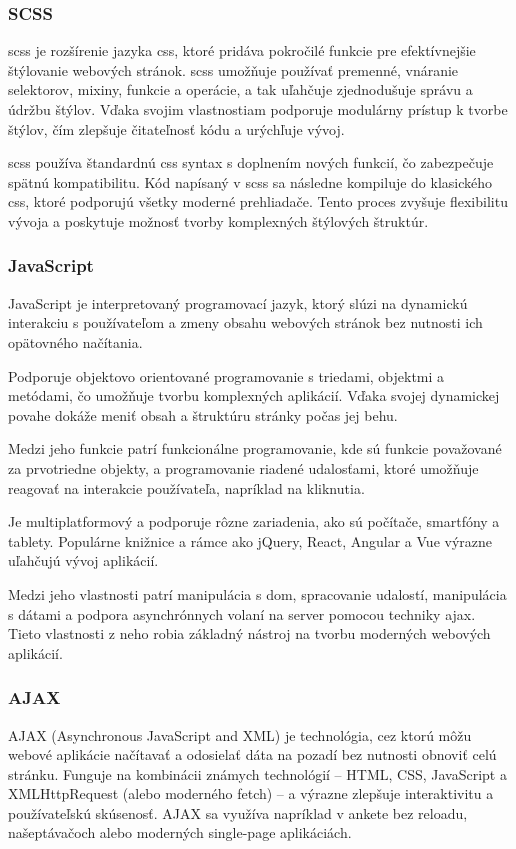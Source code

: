 \subsubsection{SCSS}
\acrfull{scss} je rozšírenie jazyka \acrshort{css}, ktoré pridáva pokročilé funkcie pre efektívnejšie štýlovanie webových stránok. 
\acrshort{scss} umožňuje používať premenné, vnáranie selektorov, mixiny, funkcie a operácie, a tak uľahčuje zjednodušuje správu a údržbu štýlov.
 Vďaka svojim vlastnostiam podporuje modulárny prístup k tvorbe štýlov, čím zlepšuje čitateľnosť kódu a urýchľuje vývoj.

 \acrshort{scss} používa štandardnú \acrshort{css} syntax s doplnením nových funkcií, čo zabezpečuje spätnú kompatibilitu.
 Kód napísaný v \acrshort{scss} sa následne kompiluje do klasického \acrshort{css}, ktoré podporujú všetky moderné prehliadače. 
Tento proces zvyšuje flexibilitu vývoja a poskytuje možnosť tvorby komplexných štýlových štruktúr.\cite{scss}
\subsubsection{JavaScript}
JavaScript je interpretovaný programovací jazyk, ktorý slúzi na dynamickú interakciu s používateľom a zmeny obsahu webových stránok bez nutnosti ich opätovného načítania.

Podporuje objektovo orientované programovanie s triedami, objektmi a metódami, čo umožňuje tvorbu komplexných aplikácií. Vďaka svojej dynamickej povahe dokáže meniť obsah a štruktúru stránky počas jej behu.

Medzi jeho funkcie patrí funkcionálne programovanie, kde sú funkcie považované za prvotriedne objekty, a programovanie riadené udalosťami, ktoré umožňuje reagovať na interakcie používateľa, napríklad na kliknutia.

Je multiplatformový a podporuje rôzne zariadenia, ako sú počítače, smartfóny a tablety. Populárne knižnice a rámce ako jQuery, React, Angular a Vue výrazne uľahčujú vývoj aplikácií.

Medzi jeho vlastnosti patrí manipulácia s \acrfull{dom}, spracovanie udalostí, manipulácia s dátami a podpora asynchrónnych volaní na server pomocou techniky \acrfull{ajax}.
 Tieto vlastnosti z neho robia základný nástroj na tvorbu moderných webových aplikácií.\cite{JavaScript}
 \subsubsection{AJAX}
 AJAX (Asynchronous JavaScript and XML) je technológia, cez ktorú môžu webové aplikácie načítavať a odosielať dáta na pozadí bez nutnosti obnoviť celú stránku.
  Funguje na kombinácii známych technológií – HTML, CSS, JavaScript a XMLHttpRequest (alebo moderného fetch) – a výrazne zlepšuje interaktivitu a používateľskú skúsenosť. 
 AJAX sa využíva napríklad v ankete bez reloadu, našeptávačoch alebo moderných single-page aplikáciách.\cite{ajax}
